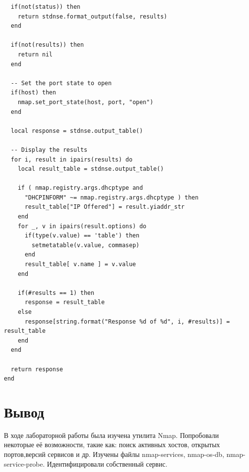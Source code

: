 \documentclass[10pt,a4paper]{report}
\begin{document}
\begin{verbatim}
  if(not(status)) then
    return stdnse.format_output(false, results)
  end

  if(not(results)) then
    return nil
  end

  -- Set the port state to open
  if(host) then
    nmap.set_port_state(host, port, "open")
  end

  local response = stdnse.output_table()

  -- Display the results
  for i, result in ipairs(results) do
    local result_table = stdnse.output_table()

    if ( nmap.registry.args.dhcptype and
      "DHCPINFORM" ~= nmap.registry.args.dhcptype ) then
      result_table["IP Offered"] = result.yiaddr_str
    end
    for _, v in ipairs(result.options) do
      if(type(v.value) == 'table') then
        setmetatable(v.value, commasep)
      end
      result_table[ v.name ] = v.value
    end

    if(#results == 1) then
      response = result_table
    else
      response[string.format("Response %d of %d", i, #results)] = result_table
    end
  end

  return response
end
\end{verbatim}
\section{Вывод}
В ходе лабораторной работы была изучена утилита Nmap. Попробовали некоторые её возможности, такие как: поиск активных хостов, открытых портов,версий сервисов и др. Изучены файлы nmap-services, nmap-os-db, nmap-service-probe. Идентифицировали собственный сервис.
\end{document}
